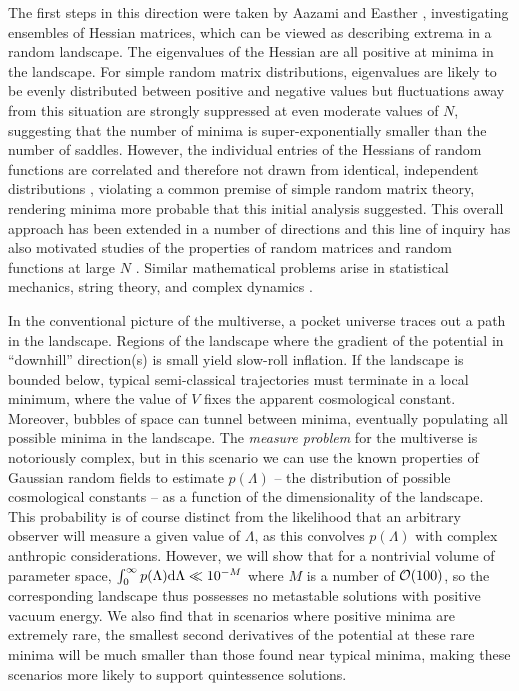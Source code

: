 \documentclass[12pt]{article}
\begin{document}
The first steps in this direction were taken by Aazami and Easther \cite{Aazami2006}, investigating ensembles of Hessian matrices, which can be viewed as describing extrema in a random landscape. The eigenvalues of the Hessian are all positive at minima in the landscape. For simple random matrix distributions, eigenvalues are likely to be evenly distributed between positive and negative values but fluctuations away from this situation are strongly suppressed at even moderate values of $N$, suggesting that the number of minima is super-exponentially smaller than the number of saddles. However, the individual entries of the Hessians of random functions are correlated and therefore not drawn from identical, independent distributions \cite{Battefeld2012,Easther2016}, violating a common premise of simple random matrix theory, rendering minima more probable that this initial analysis suggested.  This overall approach has been  extended in a number of directions \cite{Easther2006, Frazer2011, Henry2009, Marsh2013, Agarwal2011,Yang2012,Masoumi2016,Yamada2018} and this line of inquiry has also motivated studies of the properties of random matrices and random functions at large $N$ \cite{Bray2007,Dean2008,Majumdar2009,Bachlechner2014,Battefeld2012,Fyodorov2013,Masoumi2017}. Similar mathematical problems arise in statistical mechanics, string theory, and complex dynamics \cite{Fyodorov2004,Douglas2004,Douglas2006,Fyodorov2007,Fyodorov2012,Fyodorov2018,Ros2019}.

 
In the conventional picture of the multiverse, a pocket universe traces out a path in the landscape. Regions of the landscape where the gradient of the potential in ``downhill'' direction(s) is small yield slow-roll inflation. If the landscape is bounded below, typical semi-classical trajectories must terminate in a local minimum, where the value of $V$ fixes the apparent cosmological constant. Moreover, bubbles of space can tunnel between minima, eventually populating all possible minima in the landscape.  The {\em measure problem\/} for the multiverse is notoriously complex, but in this scenario we can use the known properties of Gaussian random fields to estimate $p(\Lambda)$ -- the distribution of possible cosmological constants -- as a function of the dimensionality of the landscape.  This probability is of course distinct from the likelihood that an arbitrary observer will measure a given value of $\Lambda$, as this convolves $p(\Lambda)$ with complex anthropic considerations. However, we will show that for a nontrivial volume of parameter space,  $\int_0^\infty  p(\Lambda) {\rm d}\Lambda \ll 10^{-M}$  where $M$ is a number of ${\cal{O}}(100)$, so the corresponding landscape thus possesses no metastable solutions with  positive vacuum energy. We also find that in scenarios where positive minima are extremely rare, the smallest second derivatives of the potential at these rare minima will be much smaller than those found near typical minima, making these scenarios more likely to support quintessence solutions. 
\end{document}
